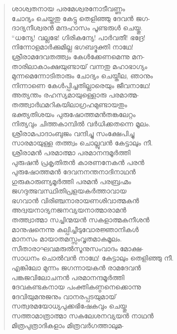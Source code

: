 \begin{verse}
ശാശ്വതനായ പരമേശ്വരനോടീവണ്ണം\\
ചോദ്യം ചെയ്തതു കേട്ടു തെളിഞ്ഞു ദേവന്‍ ജഗ-\\
ദാദ്യനീശ്വരന്‍ മന്ദഹാസം പൂണ്ടരുള്‍ ചെയ്തു.\\
“ധന്യേ! വല്ലഭേ! ഗിരികന്യേ! പാര്‍വതീ! ഭദ്രേ!\\
നിന്നോളമാര്‍ക്കുമില്ല ഭഗബദ്ഭക്തി നാഥേ!\\
ശ്രീരാമദേവതത്ത്വം കേള്‍ക്കേണമെന്നു മന-\\
താരിലാകാംക്ഷയുണ്ടായ് വന്നതു മഹാഭാഗ്യം\\
മുന്നമെന്നോടിതാരും ചോദ്യം ചെയ്തീല, ഞാനും\\
നിന്നാണെ കേള്‍പ്പിച്ചതില്ലാരെയും ജീവനാഥേ!\\
അത്യന്തം രഹസ്യമായുള്ളൊരു പരമാത്മ-\\
തത്ത്വാര്‍ഥമറികയിലാഗ്രഹമുണ്ടായതും\\
ഭക്ത്യതിശയം പുരുഷോത്തമന്‍തങ്കലേറ്റം\\
നിത്യവും ചിത്തകാമ്പില്‍ വര്‍ധിക്കതന്നെ മൂലം.\\
ശ്രീരാമപാദാംബുജം വന്ദിച്ചു സംക്ഷേപിച്ചു\\
സാരമായുള്ള തത്ത്വം ചൊല്ലുവന്‍ കേട്ടാലും നീ.\\
ശ്രീരാമന്‍ പരമാത്മാ പരമാനന്ദമൂര്‍ത്തി\\
പുരുഷന്‍ പ്രകൃതിതന്‍ കാരണനേകന്‍ പരന്‍\\
പുരുഷോത്തമന്‍ ദേവനനന്തനാദിനാഥന്‍\\
ഗുരുകാരുണ്യമൂര്‍ത്തി പരമന്‍ പരബ്രഹ്മം\\
ജഗദുത്ഭവസ്ഥിതിപ്രളയകര്‍ത്താവായ\\
ഭഗവാന്‍ വിരിഞ്ചനാരായണശിവാത്മകന്‍\\
അദ്വയനാദ്യനജനവ്യയനാത്മാരാമന്‍\\
തത്ത്വാത്മാ സച്ചിന്മയന്‍ സകളാത്മകനീശന്‍\\
മാനുഷനെന്നു കല്പിച്ചീടുവോരജ്ഞാനികള്‍\\
മാനസം മായാതമസ്സംവൃതമാകമൂലം.\\
സീതാരാഘവമരുല്‍സൂനുസംവാദം മോക്ഷ-\\
സാധനം ചൊല്‍വന്‍ നാഥേ! കേട്ടാലും തെളിഞ്ഞു നീ.\\
എങ്കിലോ മുന്നം ജഗന്നായകന്‍ രാമദേവന്‍\\
പങ്കജവിലോചനന്‍ പരമാനന്ദമൂര്‍ത്തി\\
ദേവകണ്ടകനായ പംക്തികണ്ഠനെക്കൊന്നു\\
ദേവിയുമനുജനും വാനരപ്പടയുമായ്\\
സത്വരമയോധ്യപുക്കഭിഷേകവും ചെയ്തു\\
സത്താമാത്രാത്മാ സകലേശനവ്യയന്‍ നാഥന്‍\\
മിത്രപുത്രാദികളാം മിത്രവര്‍ഗത്താലുമ-\\

\end{verse}
